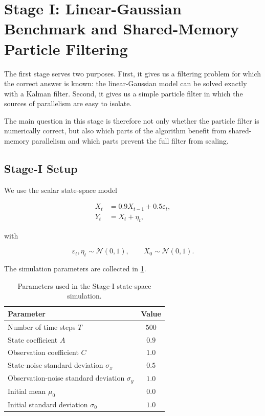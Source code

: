 \section{Stage I: Linear-Gaussian Benchmark and Shared-Memory Particle Filtering}
\label{sec:stage1}

The first stage serves two purposes. First, it gives us a filtering
problem for which the correct answer is known: the linear-Gaussian model
can be solved exactly with a Kalman filter. Second, it gives us a simple
particle filter in which the sources of parallelism are easy to isolate.

The main question in this stage is therefore not only whether the particle
filter is numerically correct, but also which parts of the algorithm
benefit from shared-memory parallelism and which parts prevent the full
filter from scaling.


\subsection{Stage-I Setup}
\label{subsec:stage1-setup}

We use the scalar state-space model

\begin{align}
	X_t &= 0.9X_{t-1} + 0.5\varepsilon_t, \\
	Y_t &= X_t + \eta_t,
\end{align}

with

\begin{equation}
	\varepsilon_t,\eta_t\sim\mathcal{N}(0,1),
	\qquad
	X_0\sim\mathcal{N}(0,1).
\end{equation}

The simulation parameters are collected in
\cref{tab:stage1-parameters}.

\begin{table}[H]
	\centering
	\caption{Parameters used in the Stage-I state-space simulation.}
	\label{tab:stage1-parameters}
	\begin{tabular}{lc}
		\toprule
		Parameter & Value \\
		\midrule
		Number of time steps \(T\) & \(500\) \\
		State coefficient \(A\) & \(0.9\) \\
		Observation coefficient \(C\) & \(1.0\) \\
		State-noise standard deviation \(\sigma_x\) & \(0.5\) \\
		Observation-noise standard deviation \(\sigma_y\) & \(1.0\) \\
		Initial mean \(\mu_0\) & \(0.0\) \\
		Initial standard deviation \(\sigma_0\) & \(1.0\) \\
		\bottomrule
	\end{tabular}
\end{table}

